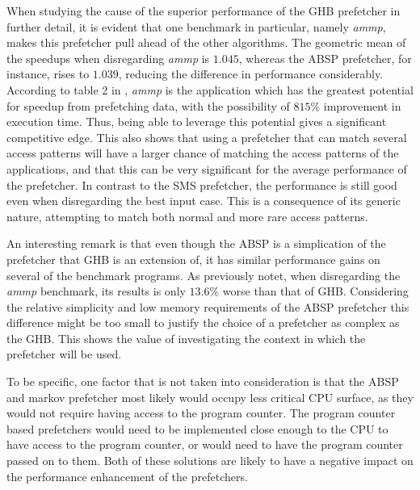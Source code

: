 When studying the cause of the superior performance of the GHB
prefetcher in further detail, it is evident that one benchmark in
particular, namely \emph{ammp}, makes this prefetcher pull ahead of the other
algorithms. The geometric mean of the speedups when disregarding \emph{ammp}
is $1.045$, whereas the ABSP prefetcher, for instance, rises to
$1.039$, reducing the difference in performance
considerably. According to table 2 in \cite{Nesbit}, \emph{ammp} is the
application which has the greatest potential for speedup from
prefetching data, with the possibility of $815\%$ improvement in
execution time. Thus, being able to leverage this potential gives a
significant competitive edge. This also shows that using a prefetcher that can match several access patterns will have a larger chance of matching the access patterns of the applications, and that this can be very significant for the average performance of the prefetcher. In contrast to the SMS prefetcher, the performance is still good even when disregarding the best input case. This is a consequence of its generic nature, attempting to match both normal and more rare access patterns.   

An interesting remark is that even though the ABSP is a simplication
of the prefetcher that GHB is an extension of, it has similar
performance gains on several of the benchmark programs. As previously notet, when disregarding the \emph{ammp} benchmark, its results is only $13.6\%$ worse than that of GHB. Considering the relative simplicity and low memory requirements of the ABSP prefetcher this difference might be too small to justify the choice of a prefetcher as complex as the GHB. This shows the value of investigating the context in which the prefetcher will be used.  

To be specific, one factor that is not taken into consideration is that the ABSP and markov prefetcher most likely would occupy less critical CPU surface, as they would not require having access to the program counter. The program counter based prefetchers would need to be implemented close enough to the CPU to have access to the program counter, or would need to have the program counter passed on to them. Both of these solutions are likely to have a negative impact on the performance enhancement of the prefetchers. 
